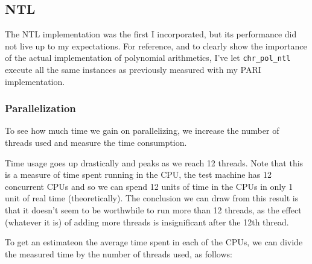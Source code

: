 \documentclass[a4paper]{article}
\newcommand{\code}{\texttt}
\begin{document}
\subsection{NTL}
The NTL implementation was the first I incorporated, but its performance did not live up to my expectations. For reference, and to clearly show the importance of the actual implementation of polynomial arithmetics, I've let \code{chr\_pol\_ntl} execute all the same instances as previously measured with my PARI implementation.

\subsubsection{Parallelization}
To see how much time we gain on parallelizing, we increase the number of threads used and measure the time consumption.

\begin{center}
\end{center}

Time usage goes up drastically and peaks as we reach 12 threads. Note that this is a measure of time spent running in the CPU, the test machine has 12 concurrent CPUs and so we can spend 12 units of time in the CPUs in only 1 unit of real time (theoretically). The conclusion we can draw from this result is that it doesn't seem to be worthwhile to run more than 12 threads, as the effect (whatever it is) of adding more threads is insignificant after the 12th thread.

To get an estimate\footnotemark on the average time spent in each of the CPUs, we can divide the measured time by the number of threads used, as follows:

\end{document}
